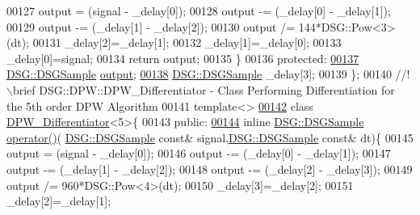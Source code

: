\begin{DoxyCode}
00127                 output  = (signal - \_delay[0]);
00128                 output -= (\_delay[0] - \_delay[1]);
00129                 output -= (\_delay[1] - \_delay[2]);
00130                 output /= 144*DSG::Pow<3>(dt);
00131                 \_delay[2]=\_delay[1];
00132                 \_delay[1]=\_delay[0];
00133                 \_delay[0]=signal;
00134                 \textcolor{keywordflow}{return} output;
00135             \}
00136         \textcolor{keyword}{protected}:
\hypertarget{_d_p_w_8h_source_l00137}{}\hyperlink{class_d_s_g_1_1_d_p_w_1_1_d_p_w___differentiator_3_014_01_4_a5fd7e2dc19c470cacb8e23942c1afdbb}{00137}             \hyperlink{namespace_d_s_g_ac39a94cd27ebcd9c1e7502d0c624894a}{DSG::DSGSample} \hyperlink{class_d_s_g_1_1_d_p_w_1_1_d_p_w___differentiator_3_014_01_4_a5fd7e2dc19c470cacb8e23942c1afdbb}{output};
\hypertarget{_d_p_w_8h_source_l00138}{}\hyperlink{class_d_s_g_1_1_d_p_w_1_1_d_p_w___differentiator_3_014_01_4_aacd153f49201708823a05aad2506ede9}{00138}             \hyperlink{namespace_d_s_g_ac39a94cd27ebcd9c1e7502d0c624894a}{DSG::DSGSample} \_delay[3];
00139         \};\textcolor{comment}{}
00140 \textcolor{comment}{        //!\(\backslash\)brief DSG::DPW::DPW\_Differentiator - Class Performing Differentiation for the 5th order DPW
       Algorithm}
00141 \textcolor{comment}{}        \textcolor{keyword}{template}<>
\hypertarget{_d_p_w_8h_source_l00142}{}\hyperlink{class_d_s_g_1_1_d_p_w_1_1_d_p_w___differentiator_3_015_01_4}{00142}         \textcolor{keyword}{class }\hyperlink{class_d_s_g_1_1_d_p_w_1_1_d_p_w___differentiator}{DPW\_Differentiator}<5>\{
00143         \textcolor{keyword}{public}:
\hypertarget{_d_p_w_8h_source_l00144}{}\hyperlink{class_d_s_g_1_1_d_p_w_1_1_d_p_w___differentiator_3_015_01_4_a58aa0475d87f841e656f725f7206fe1c}{00144}             \textcolor{keyword}{inline} \hyperlink{namespace_d_s_g_ac39a94cd27ebcd9c1e7502d0c624894a}{DSG::DSGSample} \hyperlink{class_d_s_g_1_1_d_p_w_1_1_d_p_w___differentiator_3_015_01_4_a58aa0475d87f841e656f725f7206fe1c}{operator()}(
      \hyperlink{namespace_d_s_g_ac39a94cd27ebcd9c1e7502d0c624894a}{DSG::DSGSample} \textcolor{keyword}{const}& signal,\hyperlink{namespace_d_s_g_ac39a94cd27ebcd9c1e7502d0c624894a}{DSG::DSGSample} \textcolor{keyword}{const}& dt)\{
00145                 output  = (signal - \_delay[0]);
00146                 output -= (\_delay[0] - \_delay[1]);
00147                 output -= (\_delay[1] - \_delay[2]);
00148                 output -= (\_delay[2] - \_delay[3]);
00149                 output /= 960*DSG::Pow<4>(dt);
00150                 \_delay[3]=\_delay[2];
00151                 \_delay[2]=\_delay[1];

\end{DoxyCode}
